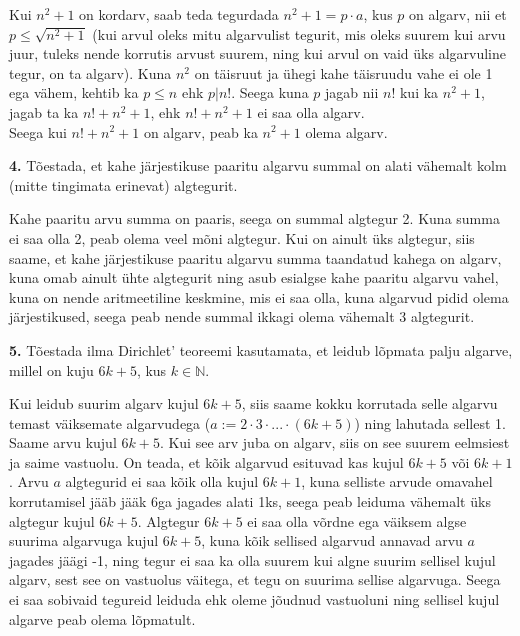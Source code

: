 \documentclass[a4paper, 10pt]{article}
\newcommand{\N}{\mathbb{N}}
\begin{document}
\bigskip

Kui $n^2+1$ on kordarv, saab teda tegurdada $n^2+1=p\cdot a$, kus $p$ on algarv, nii et $p\leq\sqrt{n^2+1}$ (kui arvul oleks mitu algarvulist tegurit, mis oleks suurem kui arvu juur, tuleks nende korrutis arvust suurem, ning kui arvul on vaid üks algarvuline tegur, on ta algarv). Kuna $n^2$ on täisruut ja ühegi kahe täisruudu vahe ei ole 1 ega vähem, kehtib ka $p\leq n$ ehk $p|n!$. Seega kuna $p$ jagab nii $n!$ kui ka $n^2+1$, jagab ta ka $n!+n^2+1$, ehk $n!+n^2+1$ ei saa olla algarv.\\
Seega kui $n!+n^2+1$ on algarv, peab ka $n^2+1$ olema algarv.

\bigskip

\noindent \textbf{4.} Tõestada, et kahe järjestikuse paaritu algarvu summal on alati vähemalt kolm (mitte tingimata erinevat) algtegurit. 

\bigskip

Kahe paaritu arvu summa on paaris, seega on summal algtegur 2. Kuna summa ei saa olla 2, peab olema veel mõni algtegur. Kui on ainult üks algtegur, siis saame, et kahe järjestikuse paaritu algarvu summa taandatud kahega on algarv, kuna omab ainult ühte algtegurit ning asub esialgse kahe paaritu algarvu vahel, kuna on nende aritmeetiline keskmine, mis ei saa olla, kuna algarvud pidid olema järjestikused, seega peab nende summal ikkagi olema vähemalt 3 algtegurit.
\bigskip

\noindent \textbf{5.} T\~oestada ilma Dirichlet' teoreemi kasutamata, et leidub l\~opmata palju algarve, millel on kuju $6k+5$, kus $k\in \N$. 

\bigskip
Kui leidub suurim algarv kujul $6k+5$, siis saame kokku korrutada selle algarvu temast väiksemate algarvudega ($a:=2\cdot 3\cdot ... \cdot (6k+5)$) ning lahutada sellest 1. Saame arvu kujul $6k+5$. Kui see arv juba on algarv, siis on see suurem eelmsiest ja saime vastuolu. On teada, et kõik algarvud esituvad kas kujul $6k+5$ või $6k+1$. Arvu $a$ algtegurid ei saa kõik olla kujul $6k+1$, kuna selliste arvude omavahel korrutamisel jääb jääk 6ga jagades alati 1ks, seega peab leiduma vähemalt üks algtegur kujul $6k+5$. Algtegur $6k+5$ ei saa olla võrdne ega väiksem algse suurima algarvuga kujul $6k+5$, kuna kõik sellised algarvud annavad arvu $a$ jagades jäägi -1, ning tegur ei saa ka olla suurem kui algne suurim sellisel kujul algarv, sest see on vastuolus väitega, et tegu on suurima sellise algarvuga. Seega ei saa sobivaid tegureid leiduda ehk oleme jõudnud vastuoluni ning sellisel kujul algarve peab olema lõpmatult.
\end{document}
